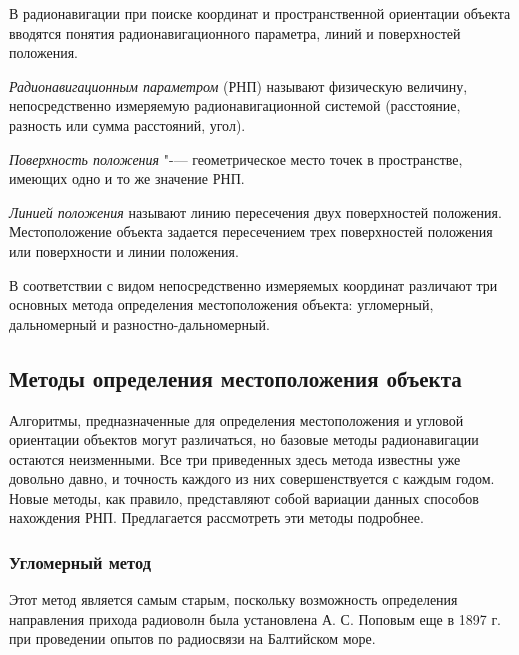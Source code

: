 \documentclass[../main.tex]{subfiles}
\begin{document}
В радионавигации при поиске координат и пространственной ориентации объекта вводятся понятия радионавигационного параметра, линий и поверхностей положения.

\textit{Радионавигационным параметром} (РНП) называют физическую величину, непосредственно измеряемую радионавигационной системой (расстояние, разность или сумма расстояний, угол).

\textit{Поверхность положения} "-— геометрическое место точек в пространстве, имеющих одно и то же значение РНП.

\textit{Линией положения} называют линию пересечения двух поверхностей положения. Местоположение объекта задается пересечением трех поверхностей положения или поверхности и линии положения.

В соответствии с видом непосредственно измеряемых координат различают три основных метода определения местоположения объекта: угломерный, дальномерный и разностно-дальномерный.

\subsection{Методы определения местоположения объекта}
Алгоритмы, предназначенные для определения местоположения и угловой ориентации объектов могут различаться, но базовые методы радионавигации остаются неизменными. Все три приведенных здесь метода известны уже довольно давно, и точность каждого из них совершенствуется с каждым годом. Новые методы, как правило, представляют собой вариации данных способов нахождения РНП. Предлагается рассмотреть эти методы подробнее.

\subsubsection{Угломерный метод}
Этот метод является самым старым, поскольку возможность определения направления прихода радиоволн была установлена А. С. Поповым еще в 1897 г. при проведении опытов по радиосвязи на Балтийском море.
\end{document}
